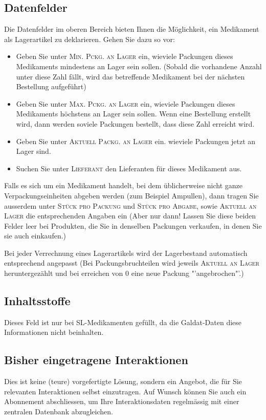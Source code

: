 \documentclass[a4paper]{scrartcl}
\begin{document}
\subsection{Datenfelder}
Die Datenfelder im oberen Bereich bieten Ihnen die Möglichkeit, ein Medikament als Lagerartikel zu deklarieren. Gehen Sie dazu so vor:
\begin{itemize}
\item Geben Sie unter \textsc{Min. Pckg. an Lager} ein, wieviele Packungen dieses Medikaments mindestens an Lager sein sollen. (Sobald die vorhandene Anzahl unter diese Zahl fällt, wird das betreffende Medikament bei der nächsten Bestellung aufgeführt)
\item Geben Sie unter \textsc{Max. Pckg. an Lager} ein, wieviele Packungen dieses Medikaments höchstens an Lager sein sollen. Wenn eine Bestellung erstellt wird, dann werden soviele Packungen bestellt, dass diese Zahl erreicht wird.
\item Geben Sie unter \textsc{Aktuell Packg. an Lager} ein. wieviele Packungen jetzt an Lager sind.
\item Suchen Sie unter \textsc{Lieferant} den Lieferanten für dieses Medikament aus.
\end{itemize}
Falls es sich um ein Medikament handelt, bei dem üblicherweise nicht ganze Verpackungseinheiten abgeben werden (zum Beispiel Ampullen), dann tragen Sie ausserdem unter \textsc{Stück pro Packung} und \textsc{Stück pro Abgabe}, sowie \textsc{Aktuell an Lager} die entsprechenden Angaben ein (Aber nur dann! Lassen Sie diese beiden Felder leer bei Produkten, die Sie in denselben Packungen verkaufen, in denen Sie sie auch einkaufen.)

\bigskip
Bei jeder Verrechnung eines Lagerartikels wird der Lagerbestand automatisch entsprechend  angepasst (Bei Packungsbruchteilen wird jeweils \textsc{Aktuell an Lager} heruntergezählt und bei erreichen von 0 eine neue Packung "'angebrochen"'.)

\subsection{Inhaltsstoffe}
Dieses Feld ist nur bei SL-Medikamenten gefüllt, da die Galdat-Daten diese Informationen nicht beinhalten.

\subsection{Bisher eingetragene Interaktionen}
Dies ist keine (teure) vorgefertigte Lösung, sondern ein Angebot, die für Sie relevanten Interaktionen selbst einzutragen. Auf Wunsch können Sie auch ein Abonnement abschliessen, um Ihre Interaktionsdaten regelmässig mit einer zentralen Datenbank abzugleichen.
\end{document}

